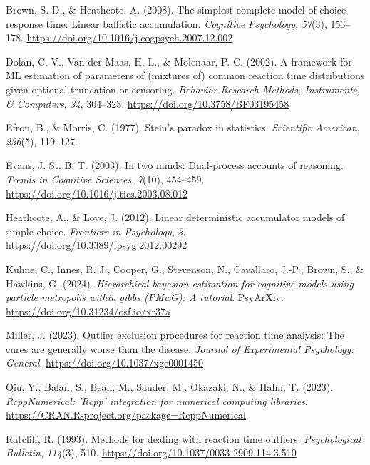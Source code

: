 \documentclass[
  stu,
  longtable,
  nolmodern,
  notxfonts,
  notimes,
  draftfirst,
  colorlinks=true,linkcolor=blue,citecolor=blue,urlcolor=blue]{apa7}
\newlength{\cslhangindent}
\newenvironment{CSLReferences}[2] %
 {\begin{list}{}{%
  \setlength{\itemindent}{0pt}
  \setlength{\leftmargin}{0pt}
  \setlength{\parsep}{0pt}
  \ifodd #1
   \setlength{\leftmargin}{\cslhangindent}
   \setlength{\itemindent}{-1\cslhangindent}
  \fi
  \setlength{\itemsep}{#2\baselineskip}}}
 {\end{list}}
\begin{document}
\label{refs}
\begin{CSLReferences}{1}{0}
Brown, S. D., \& Heathcote, A. (2008). The simplest complete model of
choice response time: Linear ballistic accumulation. \emph{Cognitive
Psychology}, \emph{57}(3), 153--178.
\url{https://doi.org/10.1016/j.cogpsych.2007.12.002}

Dolan, C. V., Van der Maas, H. L., \& Molenaar, P. C. (2002). A
framework for ML estimation of parameters of (mixtures of) common
reaction time distributions given optional truncation or censoring.
\emph{Behavior Research Methods, Instruments, \& Computers}, \emph{34},
304--323. \url{https://doi.org/10.3758/BF03195458}

Efron, B., \& Morris, C. (1977). Stein's paradox in statistics.
\emph{Scientific American}, \emph{236}(5), 119--127.

Evans, J. St. B. T. (2003). In two minds: Dual-process accounts of
reasoning. \emph{Trends in Cognitive Sciences}, \emph{7}(10), 454--459.
\url{https://doi.org/10.1016/j.tics.2003.08.012}

Heathcote, A., \& Love, J. (2012). Linear deterministic accumulator
models of simple choice. \emph{Frontiers in Psychology}, \emph{3}.
\url{https://doi.org/10.3389/fpsyg.2012.00292}

Kuhne, C., Innes, R. J., Cooper, G., Stevenson, N., Cavallaro, J.-P.,
Brown, S., \& Hawkins, G. (2024). \emph{Hierarchical bayesian estimation
for cognitive models using particle metropolis within gibbs (PMwG): A
tutorial}. PsyArXiv. \url{https://doi.org/10.31234/osf.io/xr37a}

Miller, J. (2023). Outlier exclusion procedures for reaction time
analysis: The cures are generally worse than the disease. \emph{Journal
of Experimental Psychology: General}.
\url{https://doi.org/10.1037/xge0001450}

Qiu, Y., Balan, S., Beall, M., Sauder, M., Okazaki, N., \& Hahn, T.
(2023). \emph{RcppNumerical: 'Rcpp' integration for numerical computing
libraries}. \url{https://CRAN.R-project.org/package=RcppNumerical}

Ratcliff, R. (1993). Methods for dealing with reaction time outliers.
\emph{Psychological Bulletin}, \emph{114}(3), 510.
\url{https://doi.org/10.1037/0033-2909.114.3.510}


\end{CSLReferences}
\end{document}

